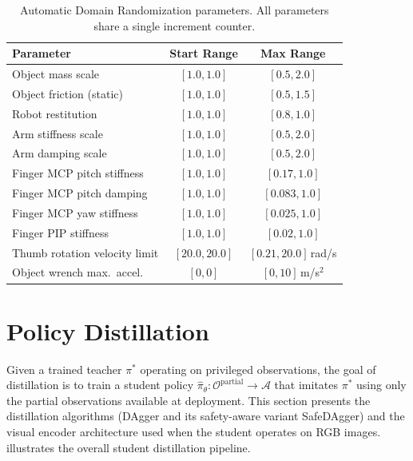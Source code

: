 \begin{table}[htb]
    \centering
    \caption{Automatic Domain Randomization parameters. All parameters share a single increment counter.}
    \label{tab:adr_params_methods}
    \begin{tabular}{lcc}
        \toprule
        \textbf{Parameter} & \textbf{Start Range} & \textbf{Max Range} \\
        \midrule
        Object mass scale & $[1.0, 1.0]$ & $[0.5, 2.0]$ \\
        Object friction (static) & $[1.0, 1.0]$ & $[0.5, 1.5]$ \\
        Robot restitution & $[1.0, 1.0]$ & $[0.8, 1.0]$ \\
        Arm stiffness scale & $[1.0, 1.0]$ & $[0.5, 2.0]$ \\
        Arm damping scale & $[1.0, 1.0]$ & $[0.5, 2.0]$ \\
        Finger MCP pitch stiffness & $[1.0, 1.0]$ & $[0.17, 1.0]$ \\
        Finger MCP pitch damping & $[1.0, 1.0]$ & $[0.083, 1.0]$ \\
        Finger MCP yaw stiffness & $[1.0, 1.0]$ & $[0.025, 1.0]$ \\
        Finger PIP stiffness & $[1.0, 1.0]$ & $[0.02, 1.0]$ \\
        Thumb rotation velocity limit & $[20.0, 20.0]$ & $[0.21, 20.0]$\,rad/s \\
        Object wrench max.\ accel.\ & $[0, 0]$ & $[0, 10]$\,m/s$^2$ \\
        \bottomrule
    \end{tabular}
\end{table}

\section{Policy Distillation}%
\label{sec:distillation_framework}%

Given a trained teacher $\pi^*$ operating on privileged observations, the goal of distillation is to train a student policy $\hat{\pi}_\theta : \mathcal{O}^{\text{partial}} \to \mathcal{A}$ that imitates $\pi^*$ using only the partial observations available at deployment.
This section presents the distillation algorithms (DAgger and its safety-aware variant SafeDAgger) and the visual encoder architecture used when the student operates on RGB images.
 illustrates the overall student distillation pipeline.

